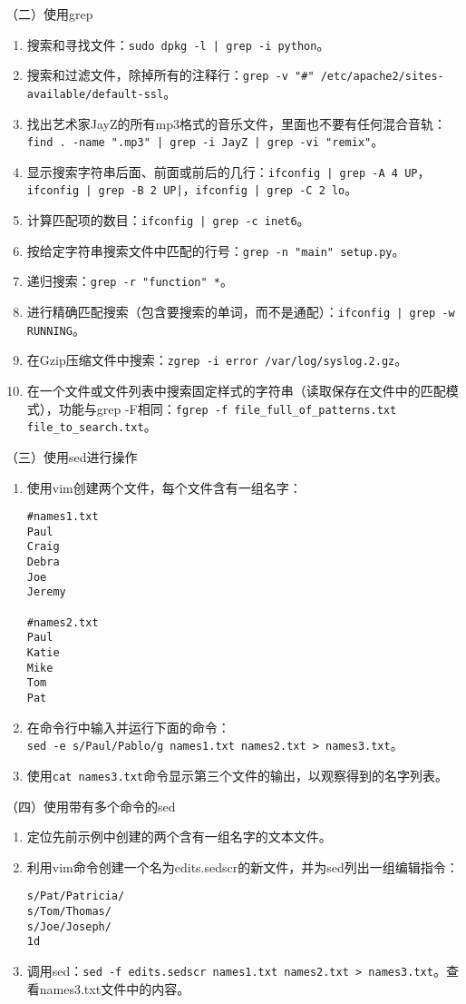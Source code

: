 \vspace{0.1in}
（二）使用grep
\begin{enumerate}
  \item 搜索和寻找文件：\verb=sudo dpkg -l | grep -i python=。
  \item 搜索和过滤文件，除掉所有的注释行：\verb|grep -v "#" /etc/apache2/sites-available/default-ssl|。
  \item 找出艺术家JayZ的所有mp3格式的音乐文件，里面也不要有任何混合音轨：\verb=find . -name ".mp3" | grep -i JayZ | grep -vi "remix"=。
  \item 显示搜索字符串后面、前面或前后的几行：\verb=ifconfig | grep -A 4 UP=，\verb=ifconfig | grep -B 2 UP|=，\verb=ifconfig | grep -C 2 lo=。
  \item 计算匹配项的数目：\verb=ifconfig | grep -c inet6=。
  \item 按给定字符串搜索文件中匹配的行号：\verb|grep -n "main" setup.py|。
  \item 递归搜索：\verb|grep -r "function" *|。
  \item 进行精确匹配搜索（包含要搜索的单词，而不是通配）：\verb=ifconfig | grep -w RUNNING=。
  \item 在Gzip压缩文件中搜索：\verb|zgrep -i error /var/log/syslog.2.gz|。
  \item 在一个文件或文件列表中搜索固定样式的字符串（读取保存在文件中的匹配模式），功能与grep -F相同：\verb|fgrep -f file_full_of_patterns.txt file_to_search.txt|。
\end{enumerate}

\vspace{0.1in}
（三）使用sed进行操作
\begin{enumerate}
  \item 使用vim创建两个文件，每个文件含有一组名字：
\begin{verbatim}
#names1.txt
Paul
Craig
Debra
Joe
Jeremy

#names2.txt
Paul
Katie
Mike
Tom
Pat
\end{verbatim}
  \item 在命令行中输入并运行下面的命令：\\ \verb|sed -e s/Paul/Pablo/g names1.txt names2.txt > names3.txt|。
  \item 使用\verb|cat names3.txt|命令显示第三个文件的输出，以观察得到的名字列表。
\end{enumerate}

\vspace{0.1in}
（四）使用带有多个命令的sed
\begin{enumerate}
  \item 定位先前示例中创建的两个含有一组名字的文本文件。
  \item 利用vim命令创建一个名为edits.sedscr的新文件，并为sed列出一组编辑指令：
\begin{verbatim}
s/Pat/Patricia/
s/Tom/Thomas/
s/Joe/Joseph/
1d
\end{verbatim}
  \item 调用sed：\verb|sed -f edits.sedscr names1.txt names2.txt > names3.txt|。查看names3.txt文件中的内容。
\end{enumerate}

